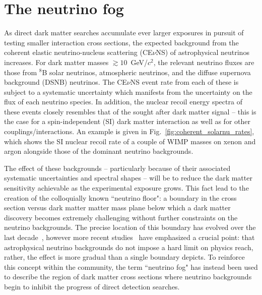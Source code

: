 \section{The neutrino fog}
\label{sec:neutrinofloor}

As direct dark matter searches accumulate ever larger exposures in pursuit of testing smaller interaction cross sections, the expected background from the coherent elastic neutrino-nucleus scattering (CE$\nu$NS) of astrophysical neutrinos increases. For dark matter masses $\gtrsim10$~GeV/$c^2$, the relevant neutrino fluxes are those from $^8$B solar neutrinos, atmospheric neutrinos, and the diffuse supernova background (DSNB) neutrinos. The CE$\nu$NS event rate from each of these is subject to a systematic uncertainty which manifests from the uncertainty on the flux of each neutrino species. In addition, the nuclear recoil energy spectra of these events closely resembles that of the sought after dark matter signal -- this is the case for a spin-independent (SI) dark matter interaction as well as for other couplings/interactions. An example is given in Fig.~\ref{fig:coherent_solarnu_rates}, which shows the SI nuclear recoil rate of a couple of WIMP masses on xenon and argon alongside those of the dominant neutrino backgrounds. 

The effect of these backgrounds -- particularly because of their associated systematic uncertainties and spectral shapes --  will be to reduce the dark matter sensitivity achievable as the experimental exposure grows. This fact lead to the creation of the colloquially known ``neutrino floor": a boundary in the cross section versus dark matter matter mass plane below which a dark matter discovery becomes extremely challenging without further constraints on the neutrino backgrounds. The precise location of this boundary has evolved over the last decade~\cite{Billard:2013qya,Gelmini:2018ogy,OHare:2020lva,OHare:2021utq}, however more recent studies~\cite{OHare:2020lva,OHare:2021utq} have emphasized a crucial point: that astrophysical neutrino backgrounds do not impose a hard limit on physics reach, rather, the effect is more gradual than a single boundary depicts. To reinforce this concept within the community, the term ``neutrino fog" has instead been used to describe the region of dark matter cross sections where neutrino backgrounds begin to inhibit the progress of direct detection searches.

